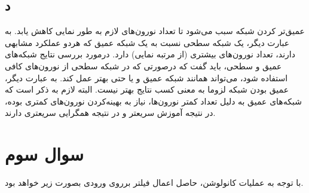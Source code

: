 \documentclass[12pt]{article}
\begin{document}
	\subsection{د}
	عمیق‌تر کردن شبکه  سبب می‌شود تا تعداد نورون‌های لازم به طور نمایی کاهش یابد. به عبارت دیگر، یک شبکه  سطحی  نسبت به یک شبکه عمیق  که هردو عملکرد مشابهی دارند، تعداد نورون‌های بیشتری (از مرتبه نمایی) دارد.
	\newline
	درمورد بررسی نتایج شبکه‌های عمیق و سطحی، باید گفت که درصورتی که در شبکه سطحی از نورون‌های کافی استفاده شود، می‌تواند همانند شبکه عمیق و یا حتی بهتر عمل کند. به عبارت دیگر، عمیق بودن شبکه لزوما به معنی کسب نتایج بهتر نیست. البته لازم به ذکر است که شبکه‌های عمیق به دلیل تعداد کمتر نورون‌ها،‌ نیاز به بهینه‌کردن نورون‌های کمتری بوده، در نتیجه آموزش سریعتر و در نتیجه همگرایی  سریعتری دارند.
	\section{سوال سوم}
			با توجه به  عملیات کانولوشن، حاصل اعمال فیلتر برروی ورودی بصورت زیر خواهد بود.
		
\end{document}
